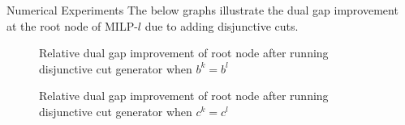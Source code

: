\documentclass[final]{beamer}
\newlength{\sepwidth}
\newlength{\colwidth}
\newcommand{\separatorcolumn}{\begin{column}{\sepwidth}\end{column}}
\begin{document}
\begin{frame}[t]
\begin{columns}[t]
\begin{column}{\colwidth}
\begin{block}{Numerical Experiments}
  	The below graphs illustrate the dual gap improvement at the root node of MILP-$ l $ due to adding disjunctive cuts.
  	\vspace{-1.5cm}
	\begin{figure}[h]
		\caption{Relative dual gap improvement of root node after running disjunctive cut generator when $ b^k = b^l $}
		\label{p:experiment_fixed_b}
	\end{figure}
	\vspace{-1.5cm}
	\begin{figure}[h]
		\caption{Relative dual gap improvement of root node after running disjunctive cut generator when $ c^k = c^l $}
		\label{p:experiment_fixed_c}
	\end{figure}
  \end{block}

\end{column}

\separatorcolumn
\end{columns}
\end{frame}
\end{document}
